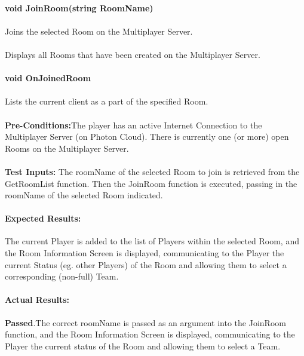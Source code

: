 \documentclass{article}
\begin{document}
    \paragraph{}\textbf{void JoinRoom(string RoomName)}
    \paragraph{} Joins the selected Room on the Multiplayer Server.
    \paragraph{} Displays all Rooms that have been created on the Multiplayer Server.
    \paragraph{}\textbf{void OnJoinedRoom}
    \paragraph{} Lists the current client as a part of the specified Room.
    \paragraph{}\textbf{Pre-Conditions:}The player has an active Internet Connection to the Multiplayer Server (on Photon Cloud). There is currently one (or more) open Rooms on the Multiplayer Server.
    \paragraph{}\textbf{Test Inputs:} The roomName of the selected Room to join is retrieved from the GetRoomList function. Then the JoinRoom function is executed, passing in the roomName of the selected Room indicated.
    \paragraph{Expected Results:} The current Player is added to the list of Players within the selected Room, and the Room Information Screen is displayed, communicating to the Player the current Status (eg. other Players) of the Room and allowing them to select a corresponding (non-full) Team.
    \paragraph{Actual Results:} \textbf{Passed}.The correct roomName is passed as an argument into the JoinRoom function, and the Room Information Screen is displayed, communicating to the Player the current status of the Room and allowing them to select a Team.
\end{document}
